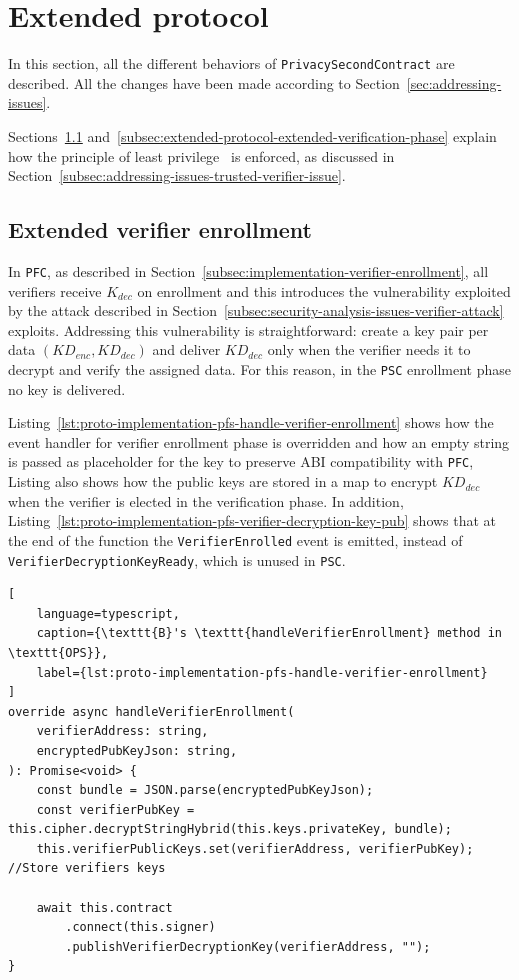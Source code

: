 \section{Extended protocol}\label{sec:implementation-extended-protocol}
In this section, all the different behaviors of \texttt{PrivacySecondContract} are described.
All the changes have been made according to Section~\ref{sec:addressing-issues}.

Sections~\ref{subsec:extended-protocol-extended-verifier-enrollment} and~\ref{subsec:extended-protocol-extended-verification-phase}
explain how the principle of least privilege~\cite{saltzer1975protection} is enforced, as discussed in Section~\ref{subsec:addressing-issues-trusted-verifier-issue}.

\subsection{Extended verifier enrollment}\label{subsec:extended-protocol-extended-verifier-enrollment}
In \texttt{PFC}, as described in Section~\ref{subsec:implementation-verifier-enrollment}, all verifiers receive $K_{dec}$ on enrollment and this introduces the vulnerability exploited by the attack described in Section~\ref{subsec:security-analysis-issues-verifier-attack} exploits.
Addressing this vulnerability is straightforward: create a key pair per data $(KD_{enc},KD_{dec})$ and deliver $KD_{dec}$ only when the verifier needs it to decrypt and verify the assigned data.
For this reason, in the \texttt{PSC} enrollment phase no key is delivered.

Listing~\ref{lst:proto-implementation-pfs-handle-verifier-enrollment} shows how the event handler for verifier enrollment phase is overridden and how an empty string is passed as placeholder for the key to preserve ABI compatibility with \texttt{PFC}, Listing also shows how the public keys are stored in a map to encrypt $KD_{dec}$ when the verifier is elected in the verification phase.
In addition, Listing~\ref{lst:proto-implementation-pfs-verifier-decryption-key-pub} shows that at the end of the function the \texttt{VerifierEnrolled} event is emitted, instead of \texttt{VerifierDecryptionKeyReady}, which is unused in \texttt{PSC}.

\begin{lstlisting}[
    language=typescript,
    caption={\texttt{B}'s \texttt{handleVerifierEnrollment} method in \texttt{OPS}},
    label={lst:proto-implementation-pfs-handle-verifier-enrollment}
]
override async handleVerifierEnrollment(
    verifierAddress: string,
    encryptedPubKeyJson: string,
): Promise<void> {
    const bundle = JSON.parse(encryptedPubKeyJson);
    const verifierPubKey = this.cipher.decryptStringHybrid(this.keys.privateKey, bundle);
    this.verifierPublicKeys.set(verifierAddress, verifierPubKey); //Store verifiers keys

    await this.contract
        .connect(this.signer)
        .publishVerifierDecryptionKey(verifierAddress, "");
}

\end{lstlisting}

